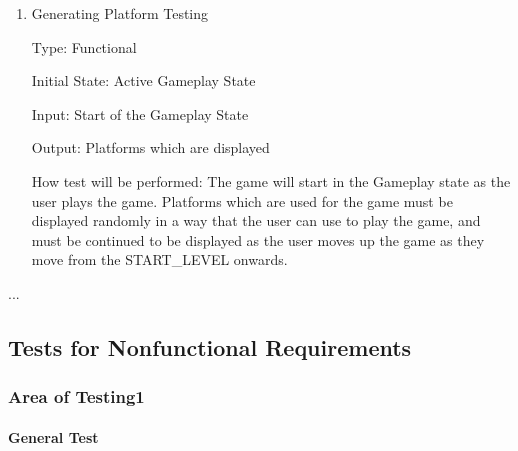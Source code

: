 \documentclass[12pt, titlepage]{article}
\begin{document}
\begin{enumerate}
\item{Generating Platform Testing\\}

Type: Functional
					
Initial State: Active Gameplay State
					
Input: Start of the Gameplay State
					
Output: Platforms which are displayed
					
How test will be performed: The game will start in the Gameplay state as the user plays the game. Platforms which are used for the game must be displayed randomly in a way that the user can use to play the game, and must be continued to be displayed as the user moves up the game as they move from the START\_LEVEL onwards.
\end{enumerate}
...

\subsection{Tests for Nonfunctional Requirements}

\subsubsection{Area of Testing1}
		
\paragraph{General Test}
\end{document}
